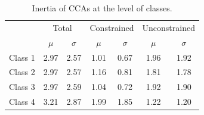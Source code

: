		\begin{table}[h!]
			
			\small
			\centering
			\caption{Inertia of CCAs at the level of classes.}
			
			\begin{tabular}{@{}lcccccc@{}}
				
				\toprule
				& \multicolumn{2}{c}{Total} & \multicolumn{2}{c}{Constrained} & \multicolumn{2}{c}{Unconstrained}\\\cmidrule(l){2-3} \cmidrule(l){4-5} \cmidrule(l){6-7}
				& $\mu$ & $\sigma$ & $\mu$ & $\sigma$ & $\mu$ & $\sigma$\\
				\hline
				Class 1 & 2.97 & 2.57 & 1.01 & 0.67 & 1.96   & 1.92 \\
				Class 2 & 2.97 & 2.57 & 1.16 & 0.81 & 1.81   & 1.78 \\
				Class 3 & 2.97 & 2.59 & 1.04 & 0.72 & 1.92   & 1.90 \\
				Class 4 & 3.21 & 2.87 & 1.99 & 1.85 & 1.22   & 1.20 \\
				\toprule
				
			\end{tabular}
		
			\label{tab:smcca5}
		
		\end{table}
			
			\vspace{15em}
			

